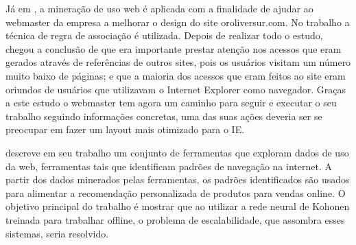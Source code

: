     Já em \cite{Carmona}, a mineração de uso web é aplicada com a finalidade de ajudar ao webmaster da empresa a melhorar o design do site oroliversur.com. No trabalho a técnica de regra de associação é utilizada. Depois de realizar todo o estudo, \cite{Carmona} chegou a conclusão de que era importante prestar atenção nos acessos que eram gerados através de referências de outros sites, pois os usuários visitam um número muito baixo de páginas; e que a maioria dos acessos que eram feitos ao site eram oriundos de usuários que utilizavam o Internet Explorer como navegador. Graças a este estudo o webmaster tem agora um caminho para seguir e executar o seu trabalho seguindo informações concretas, uma das suas ações deveria ser se preocupar em fazer um layout mais otimizado para o IE.

    \cite{Zang} descreve em seu trabalho um conjunto de ferramentas que exploram dados de uso da web, ferramentas tais que identificam padrões de navegação na internet. A partir dos dados minerados pelas ferramentas, os padrões identificados são usados para alimentar a recomendação personalizada de produtos para vendas online. O objetivo principal do trabalho é mostrar que ao utilizar a rede neural de Kohonen treinada para trabalhar offline, o problema de escalabilidade, que assombra esses sistemas, seria resolvido.

